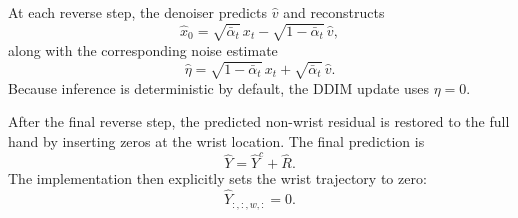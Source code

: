 \documentclass[11pt]{article}
\begin{document}
At each reverse step, the denoiser predicts $\hat{v}$ and reconstructs
\[
\hat{x}_0 = \sqrt{\bar{\alpha}_t}\,x_t - \sqrt{1-\bar{\alpha}_t}\,\hat{v},
\]
along with the corresponding noise estimate
\[
\hat{\eta} = \sqrt{1-\bar{\alpha}_t}\,x_t + \sqrt{\bar{\alpha}_t}\,\hat{v}.
\]
Because inference is deterministic by default, the DDIM update uses $\eta = 0$.

After the final reverse step, the predicted non-wrist residual is restored to the full hand by inserting zeros at the wrist location. The final prediction is
\[
\hat{Y} = \hat{Y}^{c} + \hat{R}.
\]
The implementation then explicitly sets the wrist trajectory to zero:
\[
\hat{Y}_{:, :, w, :} = 0.
\]
\end{document}
